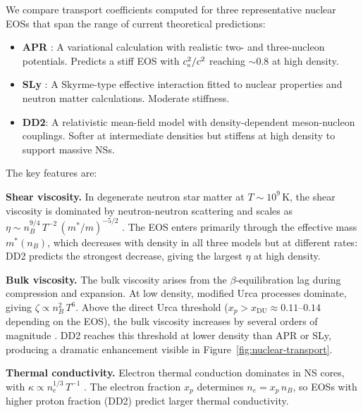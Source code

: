 We compare transport coefficients computed for three representative
nuclear EOSs that span the range of current theoretical predictions:

\begin{itemize}
  \item \textbf{APR} \citep{AkmalPR1998}: A variational calculation
    with realistic two- and three-nucleon potentials.  Predicts a stiff
    EOS with $c_{\mathrm{s}}^2/c^2$ reaching $\sim 0.8$ at high density.
  \item \textbf{SLy} \citep{DouchinHaensel2001}: A Skyrme-type
    effective interaction fitted to nuclear properties and neutron
    matter calculations.  Moderate stiffness.
  \item \textbf{DD2}: A relativistic mean-field model with
    density-dependent meson-nucleon couplings.  Softer at intermediate
    densities but stiffens at high density to support massive NSs.
\end{itemize}

The key features are:

\medskip\noindent
\textbf{Shear viscosity.}  In degenerate neutron star matter at
$T \sim 10^9$\,K, the shear viscosity is dominated by
neutron-neutron scattering and scales as
$\eta \sim n_B^{9/4}\, T^{-2}\, (m^*/m)^{-5/2}$
\citep{AlfordMahmoodi2012}.  The EOS enters primarily through the
effective mass $m^*(n_B)$, which decreases with density in all three
models but at different rates: DD2 predicts the strongest decrease,
giving the largest $\eta$ at high density.

\medskip\noindent
\textbf{Bulk viscosity.}  The bulk viscosity arises from the
$\beta$-equilibration lag during compression and expansion.  At low
density, modified Urca processes dominate, giving
$\zeta \propto n_B^2\, T^6$.  Above the direct Urca threshold
($x_p > x_{\mathrm{DU}} \approx 0.11$--$0.14$ depending on the EOS),
the bulk viscosity increases by several orders of magnitude
\citep{GavassinoAntonelli2024}.  DD2 reaches this threshold at lower
density than APR or SLy, producing a dramatic enhancement visible in
Figure~\ref{fig:nuclear-transport}.

\medskip\noindent
\textbf{Thermal conductivity.}  Electron thermal conduction dominates
in NS cores, with $\kappa \propto n_e^{1/3}\, T^{-1}$
\citep{PotekhinChabrier2018}.  The electron fraction $x_p$ determines
$n_e = x_p\, n_B$, so EOSs with higher proton fraction (DD2) predict
larger thermal conductivity.


